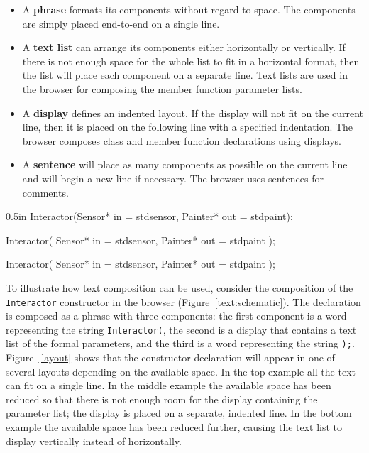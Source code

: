 \begin{itemize}

\item A {\bf phrase} formats its components without regard to space.
The components are simply placed end-to-end on a single line.

\item A {\bf text list} can arrange its components either horizontally or
vertically.  If there is not enough space for the whole list to fit in
a horizontal format, then the list will place each component on a separate
line.  Text lists are used in the browser for composing the member
function parameter lists.

\item A {\bf display} defines an indented layout.  If the display will not
fit on the current line, then it is placed on the following line with a
specified indentation.
The browser composes class
and member function declarations using displays.

\item A {\bf sentence} will place as many components as possible on the
current line and will begin a new line if necessary.  The browser uses
sentences for comments.

\end{itemize}

\begin{figure*}
\begin{code}{0.5in}
Interactor(Sensor* in = stdsensor, Painter* out = stdpaint);

Interactor(
    Sensor* in = stdsensor, Painter* out = stdpaint
);

Interactor(
    Sensor* in = stdsensor,
    Painter* out = stdpaint
);
\end{code}
\vspace{1ex}
\caption{Possible layouts of the {\tt Interactor} constructor}
\label{layout}
\end{figure*}

To illustrate how text composition can be used, consider the
composition of the {\tt Interactor} constructor in the browser
(Figure~\ref{text:schematic}).  The declaration is composed as a
phrase with three components: the first component is a word
representing the string {\tt Interactor(}, the second is a display
that contains a text list of the formal parameters, and the third is a
word representing the string {\tt );}.  Figure~\ref{layout} shows that
the constructor declaration will appear in one of several layouts
depending on the available space.  In the top example all the text can
fit on a single line.  In the middle example the available space has
been reduced so that there is not enough room for the display
containing the parameter list; the display is placed on a separate,
indented line.  In the bottom example the available space has been
reduced further, causing the text list to display vertically instead
of horizontally.

